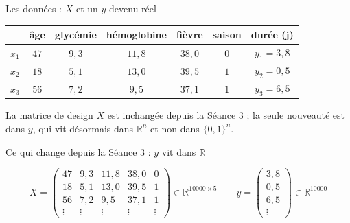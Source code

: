 \documentclass[aspectratio=169,11pt]{beamer}
\begin{document}
\begin{frame}{Les données : $X$ et un $y$ devenu réel}
\begin{ucadex}
{\footnotesize \renewcommand{\arraystretch}{1.0}\begin{tabular}{c|ccccc|c}
 & âge & glycémie & hémoglobine & fièvre & saison & durée (j)\\\hline
$x_1$ & $47$ & $9{,}3$ & $11{,}8$ & $38{,}0$ & $0$ & $y_1 = 3{,}8$\\
$x_2$ & $18$ & $5{,}1$ & $13{,}0$ & $39{,}5$ & $1$ & $y_2 = 0{,}5$\\
$x_3$ & $56$ & $7{,}2$ & $9{,}5$ & $37{,}1$ & $1$ & $y_3 = 6{,}5$\\
\end{tabular}}
\end{ucadex}
{\small La matrice de design $X$ est inchangée depuis la Séance 3 ; la seule nouveauté est dans $y$, qui vit désormais dans $\mathbb{R}^{n}$ et non dans $\{0,1\}^{n}$.}
\end{frame}

\begin{frame}{Ce qui change depuis la Séance 3 : $y$ vit dans $\mathbb{R}$}
\begin{ucadex}[$X$ et $y$ de DataSANTÉ-221]
{\footnotesize \[ X=\begin{pmatrix} 47 & 9{,}3 & 11{,}8 & 38{,}0 & 0\\ 18 & 5{,}1 & 13{,}0 & 39{,}5 & 1\\ 56 & 7{,}2 & 9{,}5 & 37{,}1 & 1\\ \vdots & \vdots & \vdots & \vdots & \vdots \end{pmatrix} \in \mathbb{R}^{10000\times 5} \qquad y=\begin{pmatrix} 3{,}8\\ 0{,}5\\ 6{,}5\\ \vdots \end{pmatrix} \in \mathbb{R}^{10000} \]}
\end{ucadex}
\end{frame}
\end{document}

